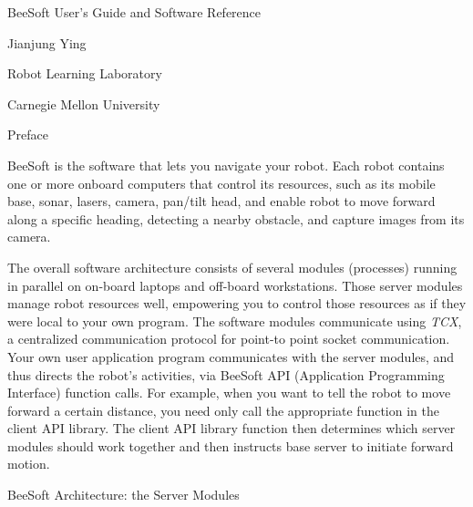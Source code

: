 
{\bf \par BeeSoft User's Guide and Software Reference\par }\par
Jianjung Ying\par \par Robot Learning Laboratory\par \par Carnegie
Mellon University\par \par \par \par Preface\par \par BeeSoft is the
software that lets you navigate your robot. Each robot contains one or
more onboard computers that control its resources, such as its mobile
base, sonar, lasers, camera, pan/tilt head, and enable robot to move
forward along a specific heading, detecting a nearby obstacle, and
capture images from its camera.\par \par The overall software
architecture consists of several modules (processes) running in
parallel on on-board laptops and off-board workstations. Those server
modules manage robot resources well, empowering you to control those
resources as if they were local to your own program. The software
modules communicate using {\it TCX}, a centralized communication
protocol for point-to point socket communication. Your own user
application program communicates with the server modules, and thus
directs the robot's activities, via BeeSoft API (Application
Programming Interface) function calls. For example, when you want to
tell the robot to move forward a certain distance, you need only call
the appropriate function in the client API library. The client API
library function then determines which server modules should work
together and then instructs base server to initiate forward
motion.\par \par BeeSoft Architecture: the Server Modules\par

